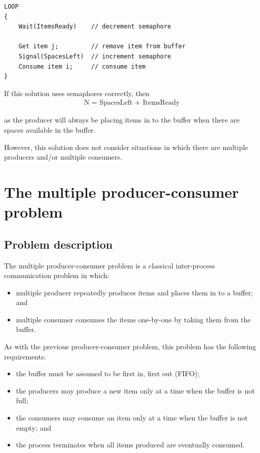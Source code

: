 \documentclass[a4paper]{systems-software}
\begin{document}
\begin{lstlisting}[title={Consumer class}]
LOOP
{
	Wait(ItemsReady)    // decrement semaphore

	Get item j;         // remove item from buffer
	Signal(SpacesLeft)  // increment semaphore
	Consume item i;     // consume item
}
\end{lstlisting}

If this solution uses semaphores correctly, then
\begin{equation*}
	\begin{aligned}
		\text{N = SpacesLeft + ItemsReady}
	\end{aligned}
\end{equation*}

as the producer will always be placing items in to the buffer when there are spaces available in the buffer.

However, this solution does not consider situations in which there are multiple producers and/or multiple consumers.


\newpage

\section*{The multiple producer-consumer problem}

\subsection*{Problem description}

The multiple producer-consumer problem is a classical inter-process communication problem in which:
\begin{itemize}
	\item multiple producer repeatedly produces items and places them in to a buffer; and
	\item multiple consumer consumes the items one-by-one by taking them from the buffer.
\end{itemize}

As with the previous producer-consumer problem, this problem has the following requirements:
\begin{itemize}
	\item the buffer must be assumed to be first in, first out (FIFO);
	\item the producers may produce a new item only at a time when the buffer is not full;
	\item the consumers may consume an item only at a time when the buffer is not empty; and
	\item the process terminates when all items produced are eventually consumed.
\end{itemize}
\end{document}
